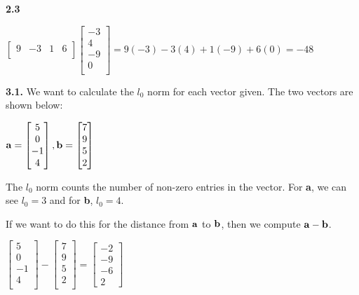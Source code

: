 \documentclass[12pt]{article}
\begin{document}
{\bf 2.3} 

\begin{center}
$
\begin{bmatrix}
9 & -3 & 1 & 6\\
\end{bmatrix}
\begin{bmatrix}
-3\\
4\\
-9\\
0\\
\end{bmatrix}=
9(-3)-3(4)+1(-9)+6(0)=-48
$
\end{center}

{\bf 3.1.} We want to calculate the $l_{0}$ norm for each vector given. The two vectors are shown below:

\begin{center}
$
{\bf a}=
\begin{bmatrix}
5\\
0\\
-1\\
4\\
\end{bmatrix}, {\bf b}=
\begin{bmatrix}
7\\
9\\
5\\
2\\
\end{bmatrix}
$\\
\end{center}

The $l_{0}$ norm counts the number of non-zero entries in the vector. For {\bf a}, we can see $l_{0}=3$ and for {\bf b}, $l_{0}=4$. 

If we want to do this for the distance from ${\bf a}$ to ${\bf b}$, then we compute ${\bf a-b}$.

\begin{center}
$\begin{bmatrix}5\\0\\-1\\4\\\end{bmatrix}-\begin{bmatrix}7\\9\\5\\2\\\end{bmatrix}=\begin{bmatrix}-2\\-9\\-6\\2\end{bmatrix}$\\
\end{center}
\end{document}
